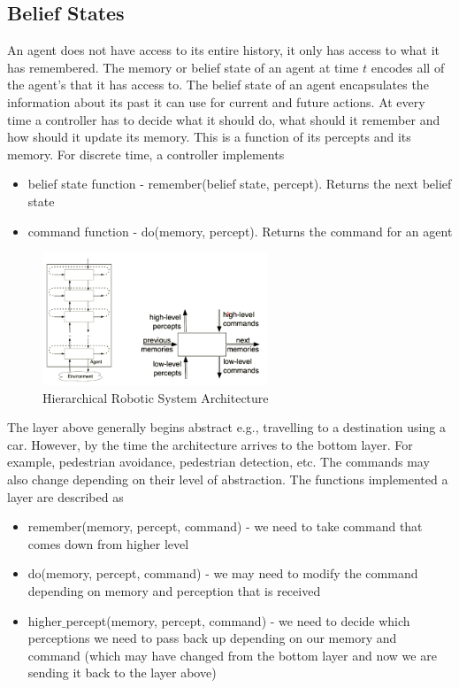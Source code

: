 \documentclass[a4paper]{article}
\theoremstyle{plain}
\theoremstyle{definition}
\theoremstyle{remark}
\begin{document}
\subsection{Belief States}
An agent does not have access to its entire history, it only has access to what it has remembered. The memory or belief state of an agent at time $t$ encodes all of the agent's that it has access to. The belief state of an agent encapsulates the information about its past it can use for current and future actions. At every time a controller has to decide what it should do, what should it remember and how should it update its memory. This is a function of its percepts and its memory. For discrete time, a controller implements
\begin{itemize}
	\item belief state function - remember(belief state, percept). Returns the next belief state
	\item command function - do(memory, percept). Returns the command for an agent
\end{itemize}
\begin{figure}[H]
	\centering
	\includegraphics[width=0.6\textwidth]{2.png}
	\caption{Hierarchical Robotic System Architecture}
	\label{fig:2-png}
\end{figure}
The layer above generally begins abstract e.g., travelling to a destination using a car. However, by the time the architecture arrives to the bottom layer. For example, pedestrian avoidance, pedestrian detection, etc. The commands may also change depending on their level of abstraction. The functions implemented a layer are described as
\begin{itemize}
	\item remember(memory, percept, command) - we need to take command that comes down from higher level
	\item do(memory, percept, command) - we may need to modify the command depending on memory and perception that is received
	\item higher$\_$percept(memory, percept, command) - we need to decide which perceptions we need to pass back up depending on our memory and command (which may have changed from the bottom layer and now we are sending it back to the layer above)
\end{itemize}
\end{document}
